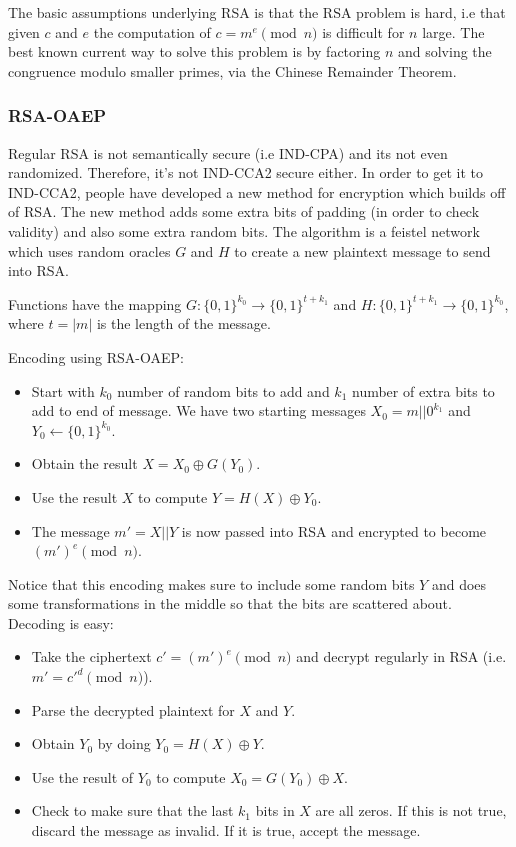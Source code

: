 \documentclass[psamsfonts]{amsart}
\begin{document}
The basic assumptions underlying RSA is that the RSA problem is hard, i.e that given $c$ and $e$ the computation of $c = m^e \pmod{n}$ is difficult for $n$ large. The best known current way to solve this problem is by factoring $n$ and solving the congruence modulo smaller primes, via the Chinese Remainder Theorem.

\subsubsection{RSA-OAEP}

Regular RSA is not semantically secure (i.e IND-CPA) and its not even randomized. Therefore, it's not IND-CCA2 secure either. In order to get it to IND-CCA2, people have developed a new method for encryption which builds off of RSA. The new method adds some extra bits of padding (in order to check validity) and also some extra random bits. The algorithm is a feistel network which uses random oracles $G$ and $H$ to create a new plaintext message to send into RSA.

Functions have the mapping $G: \{0,1\}^{k_0} \to \{0,1\}^{t + k_1}$ and $H: \{0,1\}^{t + k_1} \to \{0,1\}^{k_0}$, where $t = |m|$ is the length of the message.

Encoding using RSA-OAEP:
\begin{itemize}
  \item Start with $k_0$ number of random bits to add and $k_1$ number of extra bits to add to end of message. We have two starting messages $X_0 = m || 0^{k_1}$ and $Y_0 \leftarrow \{0,1\}^{k_0}$.
  \item Obtain the result $X = X_0 \oplus G(Y_0)$.
  \item Use the result $X$ to compute $Y = H(X) \oplus Y_0$.
  \item The message $m' = X || Y$ is now passed into RSA and encrypted to become $(m')^e \pmod{n}$.
\end{itemize}

Notice that this encoding makes sure to include some random bits $Y$ and does some transformations in the middle so that the bits are scattered about. Decoding is easy:
\begin{itemize}
  \item Take the ciphertext $c' = (m')^e \pmod{n}$ and decrypt regularly in RSA (i.e. $m' = c'^d \pmod{n}$).
  \item Parse the decrypted plaintext for $X$ and $Y$.
  \item Obtain $Y_0$ by doing $Y_0 = H(X) \oplus Y$.
  \item Use the result of $Y_0$ to compute $X_0 = G(Y_0) \oplus X$.
  \item Check to make sure that the last $k_1$ bits in $X$ are all zeros. If this is not true, discard the message as invalid. If it is true, accept the message.
\end{itemize}
\end{document}
